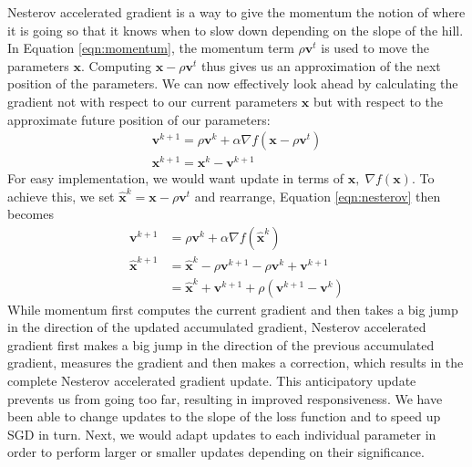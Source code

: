 \documentclass[12pt]{report}
\numberwithin{equation}{section}
\begin{document}
Nesterov accelerated gradient \textbf{\cite{nesterov1983method}} is a way to give the momentum the notion of where it is going so that it knows when to slow down depending on the slope of the hill.  In Equation \ref{eqn:momentum}, the momentum term $\rho \bm{v}^{t}$ is used to move the parameters $\bm{x}$. Computing $\bm{x} - \rho \bm{v}^{t}$ thus gives us an approximation of the next position of the parameters. We can now effectively look ahead by calculating the gradient not with respect to our current parameters $\bm{x}$ but with respect to the approximate future position of our parameters:
\begin{equation}
\begin{array}{l}\label{eqn:nesterov}
\bm{v}^{k+1} = \rho \bm{v}^{k} + \alpha \nabla f(\bm{x} - \rho \bm{v}^{t}) \\
\bm{x}^{k+1} = \bm{x}^{k}- \bm{v}^{k+1}
\end{array}
\end{equation} \noindent
For easy implementation, we would want update in terms of $\bm{x}, \; \nabla f(\bm{x})$. To achieve this, we set $\hat{\bm{x}}^k = \bm{x} - \rho \bm{v}^{t}$ and rearrange, Equation \ref{eqn:nesterov} then becomes
\begin{equation}
\begin{array}{ll}\label{eqn:nesterov_e}
\bm{v}^{k+1} &= \rho \bm{v}^{k} + \alpha \nabla f(\hat{\bm{x}}^k) \\
\hat{\bm{x}}^{k+1} &= \hat{\bm{x}}^k - \rho \bm{v}^{k+1} - \rho \bm{v}^{k} + \bm{v}^{k+1} \\
			 &= \hat{\bm{x}}^k + \bm{v}^{k+1} + \rho(\bm{v}^{k+1} - \bm{v}^{k})
\end{array}
\end{equation} \noindent
While momentum first computes the current gradient and then takes a big jump in the direction of the updated accumulated gradient, Nesterov accelerated gradient first makes a big jump in the direction of the previous accumulated gradient, measures the gradient and then makes a correction, which results in the complete Nesterov accelerated gradient update. This anticipatory update prevents us from going too far, resulting in improved responsiveness. We have been able to change updates to the slope of the loss function and to speed up SGD in turn. Next, we would adapt updates to each individual parameter in order to perform larger or smaller updates depending on their significance. 
\end{document}
